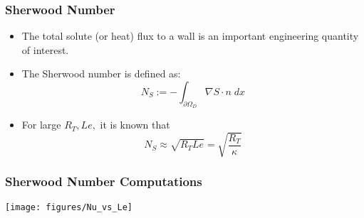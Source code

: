 
\begin{frame}[t]
  \frametitle{Sherwood Number}
  \begin{itemize}
  \item {The total solute (or heat) flux to a wall is an important engineering quantity of interest.}
  \item {The Sherwood number is defined as:
    \begin{equation}
      \nonumber
      N_S := -\int_{\partial \Omega_D} \!\!\!\!\!\!\! \nabla S \cdot n \;dx 
    \end{equation}
    }
  \item{For large $R_T, Le,$ it is known that 
    \begin{equation}
      \nonumber
      N_S \approx \sqrt{R_T Le} = \sqrt{\frac{R_T}{\kappa}}
    \end{equation}
  }
  \end{itemize}
\end{frame}




\begin{frame}
  \frametitle{Sherwood Number Computations}
  \vspace{-.25in}
  \begin{center}
      \texttt{[image: figures/Nu\_vs\_Le]}
  \end{center}
\end{frame}
